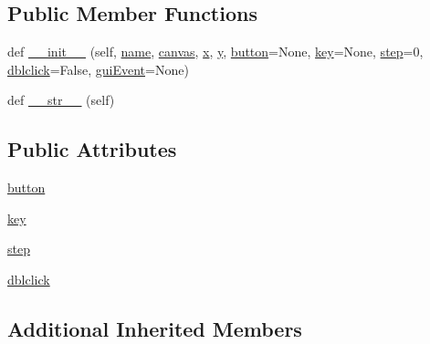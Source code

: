 \subsection*{Public Member Functions}
\begin{DoxyCompactItemize}
\item 
def \hyperlink{classmatplotlib_1_1backend__bases_1_1MouseEvent_a50d4773771416d12a692e5c5086fdc97}{\+\_\+\+\_\+init\+\_\+\+\_\+} (self, \hyperlink{classmatplotlib_1_1backend__bases_1_1Event_a4b10ea7af7c8a0b20bcdbb9ca03e1654}{name}, \hyperlink{classmatplotlib_1_1backend__bases_1_1Event_a7721d867d81a1255b1aeb51babec4e14}{canvas}, \hyperlink{classmatplotlib_1_1backend__bases_1_1LocationEvent_aad07eb863241b9e4a4bfce29833a693b}{x}, \hyperlink{classmatplotlib_1_1backend__bases_1_1LocationEvent_a77dbd95e105ce5a66024d85dac58943b}{y}, \hyperlink{classmatplotlib_1_1backend__bases_1_1MouseEvent_a4027cbeddeef5c645d789bce26678a5c}{button}=None, \hyperlink{classmatplotlib_1_1backend__bases_1_1MouseEvent_a821fb262544e599613e22805f701e177}{key}=None, \hyperlink{classmatplotlib_1_1backend__bases_1_1MouseEvent_ab03b6123a5a55aedd1361a15f8a6cd34}{step}=0, \hyperlink{classmatplotlib_1_1backend__bases_1_1MouseEvent_a758e38e1d89671e3e26f089cf07192dc}{dblclick}=False, \hyperlink{classmatplotlib_1_1backend__bases_1_1Event_a6cc1dc3c9479b3e5f227f329037adb98}{gui\+Event}=None)
\item 
def \hyperlink{classmatplotlib_1_1backend__bases_1_1MouseEvent_a3449be2a850a789e771d608fe711e771}{\+\_\+\+\_\+str\+\_\+\+\_\+} (self)
\end{DoxyCompactItemize}
\subsection*{Public Attributes}
\begin{DoxyCompactItemize}
\item 
\hyperlink{classmatplotlib_1_1backend__bases_1_1MouseEvent_a4027cbeddeef5c645d789bce26678a5c}{button}
\item 
\hyperlink{classmatplotlib_1_1backend__bases_1_1MouseEvent_a821fb262544e599613e22805f701e177}{key}
\item 
\hyperlink{classmatplotlib_1_1backend__bases_1_1MouseEvent_ab03b6123a5a55aedd1361a15f8a6cd34}{step}
\item 
\hyperlink{classmatplotlib_1_1backend__bases_1_1MouseEvent_a758e38e1d89671e3e26f089cf07192dc}{dblclick}
\end{DoxyCompactItemize}
\subsection*{Additional Inherited Members}


